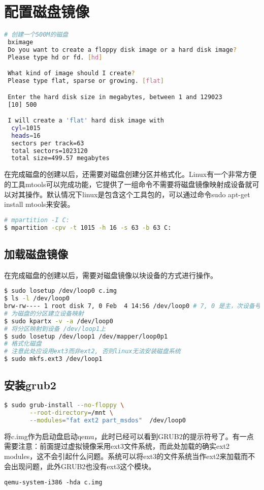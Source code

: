 \documentclass[b5paper,9pt,twoside,openany]{article}
\begin{document}
\section{配置磁盘镜像}
\begin{lstlisting}[language=bash]
# 创建一个500M的磁盘
 bximage
 Do you want to create a floppy disk image or a hard disk image?
 Please type hd or fd. [hd] 

 What kind of image should I create?
 Please type flat, sparse or growing. [flat]

 Enter the hard disk size in megabytes, between 1 and 129023
 [10] 500

 I will create a 'flat' hard disk image with
  cyl=1015
  heads=16
  sectors per track=63
  total sectors=1023120
  total size=499.57 megabytes
\end{lstlisting}

在完成磁盘的创建以后，还需要对磁盘创建分区并格式化。Linux有一个非常方便的工具mtools可以完成功能，它提供了一组命令不需要将磁盘镜像映射成设备就可以对其操作。默认情况下linux是包含这个工具包的，可以通过命令sudo apt-get install mtools来安装。
\begin{lstlisting}[language=bash]
# mpartition -I C:
$ mpartition -cpv -t 1015 -h 16 -s 63 -b 63 C:
\end{lstlisting}

\subsection{加载磁盘镜像}
在完成磁盘的创建以后，需要对磁盘镜像以块设备的方式进行操作。
\begin{lstlisting}[language=bash]
$ sudo losetup /dev/loop0 c.img
$ ls -l /dev/loop0
brw-rw---- 1 root disk 7, 0 Feb  4 14:56 /dev/loop0 # 7, 0 是主，次设备号
# 为磁盘的分区建立设备映射
$ sudo kpartx -v -a /dev/loop0
# 将分区映射到设备 /dev/loop1上
$ sudo losetup /dev/loop1 /dev/mapper/loop0p1
# 格式化磁盘
# 注意此处应设用ext3而非ext2, 否则linux无法安装磁盘系统
$ sudo mkfs.ext3 /dev/loop1
\end{lstlisting}

\subsection{安装grub2}

\begin{lstlisting}[language=bash]
$ sudo grub-install --no-floppy \
       --root-directory=/mnt \
       --modules="fat ext2 part_msdos"  /dev/loop0
\end{lstlisting}
将c.img作为启动盘启动qemu，此时已经可以看到GRUB2的提示符号了。有一点需要注意：前面提过虚拟镜像采用ext3文件系统，而此处加载的确实ext2 modules，这不会引起什么问题。系统可以将ext3的文件系统当作ext2来加载而不会出现问题，此外GRUB2也没有ext3这个模块。
\begin{lstlisting}
qemu-system-i386 -hda c.img
\end{lstlisting}
\end{document}
